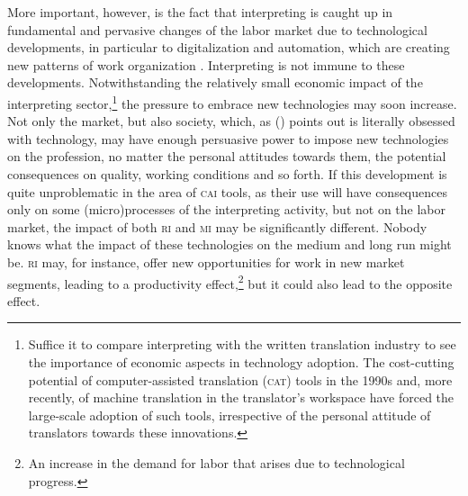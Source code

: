 \documentclass[output=paper]{langsci/langscibook}
\begin{document}
More important, however, is the fact that interpreting is caught up in fundamental and pervasive changes of the labor market due to technological developments, in particular to digitalization and automation, which are creating new patterns of work organization \citep{ursula_huws_logged_2016,neufeind_work_2018}. Interpreting is not immune to these developments. Notwithstanding the relatively small economic impact of the interpreting sector,\footnote{Suffice it to compare interpreting with the written translation industry to see the importance of economic aspects in technology adoption. The cost-cutting potential of computer-assisted translation (\textsc{cat}) tools in the 1990s and, more recently, of machine translation in the translator’s workspace have forced the large-scale adoption of such tools, irrespective of the personal attitude of translators towards these innovations.} the pressure to embrace new technologies may soon increase. Not only the market, but also society, which, as \citeauthor{besnier_homme_2012} (\citeyear{besnier_homme_2012}) points out is literally obsessed with technology, may have enough persuasive power to impose new technologies on the profession, no matter the personal attitudes towards them, the potential consequences on quality, working conditions and so forth. If this development is quite unproblematic in the area of \textsc{cai} tools, as their use will have consequences only on some (micro)processes of the interpreting activity, but not on the labor market, the impact of both \textsc{ri} and \textsc{mi} may be significantly different. Nobody knows what the impact of these technologies on the medium and long run might be. \textsc{ri} may, for instance, offer new opportunities for work in new market segments, leading to a productivity effect,\footnote{An increase in the demand for labor that arises due to technological progress.} but it could also lead to the opposite effect. 
\end{document}
